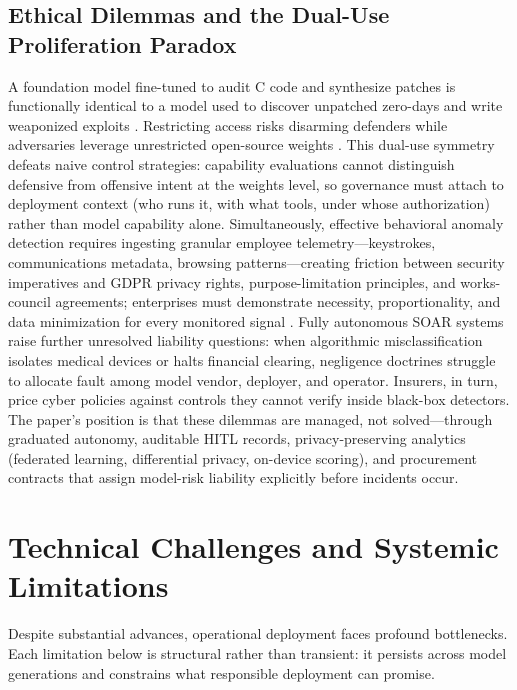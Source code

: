 \documentclass[conference,10pt,twocolumn,a4paper]{IEEEtran}
\begin{document}
\subsection{Ethical Dilemmas and the Dual-Use Proliferation Paradox}
A foundation model fine-tuned to audit C code and synthesize patches is functionally identical to a model used to discover unpatched zero-days and write weaponized exploits \cite{darpa_aixcc_2025, enisa_frontier_2026}. Restricting access risks disarming defenders while adversaries leverage unrestricted open-source weights \cite{cisa_aa26_251a, zou2023universal}. This dual-use symmetry defeats naive control strategies: capability evaluations cannot distinguish defensive from offensive intent at the weights level, so governance must attach to deployment context (who runs it, with what tools, under whose authorization) rather than model capability alone. Simultaneously, effective behavioral anomaly detection requires ingesting granular employee telemetry---keystrokes, communications metadata, browsing patterns---creating friction between security imperatives and GDPR privacy rights, purpose-limitation principles, and works-council agreements; enterprises must demonstrate necessity, proportionality, and data minimization for every monitored signal \cite{eu_ai_act_2024, nist_ir_8596_2025}. Fully autonomous SOAR systems raise further unresolved liability questions: when algorithmic misclassification isolates medical devices or halts financial clearing, negligence doctrines struggle to allocate fault among model vendor, deployer, and operator. Insurers, in turn, price cyber policies against controls they cannot verify inside black-box detectors. The paper's position is that these dilemmas are managed, not solved---through graduated autonomy, auditable HITL records, privacy-preserving analytics (federated learning, differential privacy, on-device scoring), and procurement contracts that assign model-risk liability explicitly before incidents occur.

\section{Technical Challenges and Systemic Limitations}
\label{sec:challenges}
Despite substantial advances, operational deployment faces profound bottlenecks. Each limitation below is structural rather than transient: it persists across model generations and constrains what responsible deployment can promise.
\end{document}
